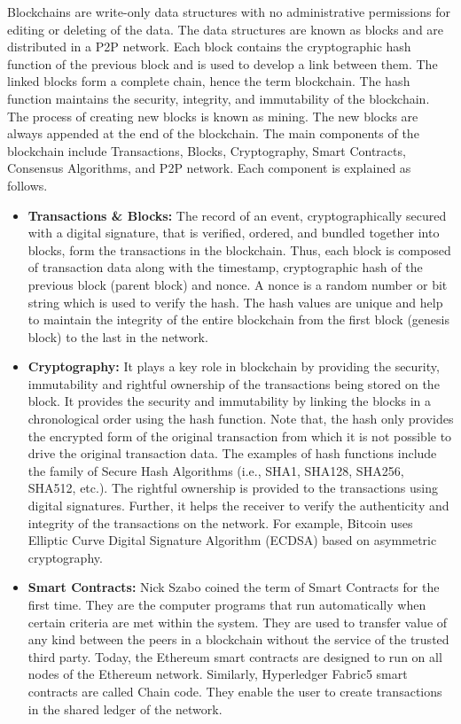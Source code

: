 \documentclass[conference]{IEEEtran}
\begin{document}
Blockchains are write-only data structures with no administrative permissions for editing or deleting of the data. The data structures are known as blocks and are distributed in a P2P network. Each block contains the cryptographic hash function of the previous block and is used to develop a link between them. The linked blocks form a complete chain, hence the term blockchain. The hash function maintains the security, integrity, and immutability of the blockchain. The process of creating new blocks is known as mining. The new blocks are always appended at the end of the blockchain. The main components of the blockchain include Transactions, Blocks, Cryptography, Smart Contracts, Consensus Algorithms, and P2P network. Each component is explained as follows. 
\begin{itemize}
	\item \textbf{Transactions \& Blocks:} The record of an event, cryptographically secured with a digital signature, that is veriﬁed, ordered, and bundled together into blocks, form the transactions in the blockchain. Thus, each block is composed of transaction data along with the timestamp, cryptographic hash of the previous block (parent block) and nonce. A nonce is a random number or bit string which is used to verify the hash. The hash values are unique and help to maintain the integrity of the entire blockchain from the ﬁrst block (genesis block) to the last in the network. 
	
	\item \textbf{Cryptography:} It plays a key role in blockchain by providing the security, immutability and rightful ownership of the transactions being stored on the block. It provides the security and immutability by linking the blocks in a chronological order using the hash function. Note that, the hash only provides the encrypted form of the original transaction from which it is not possible to drive the original transaction data. The examples of hash functions include the family of Secure Hash Algorithms (i.e., SHA1, SHA128, SHA256, SHA512, etc.). The rightful ownership is provided to the transactions using digital signatures. Further, it helps the receiver to verify the authenticity and integrity of the transactions on the network. For example, Bitcoin uses Elliptic Curve Digital Signature Algorithm (ECDSA) based on asymmetric cryptography.
	
	\item \textbf{Smart Contracts: }Nick Szabo coined the term of Smart Contracts for the ﬁrst time. They are the computer programs that run automatically when certain criteria are met within the system. They are used to transfer value of any kind between the peers in a blockchain without the service of the trusted third party. Today, the Ethereum smart contracts are designed to run on all nodes of the Ethereum network. Similarly, Hyperledger Fabric5 smart contracts are called Chain code. They enable the user to create transactions in the shared ledger of the network. 
	

\end{itemize}
\end{document}
